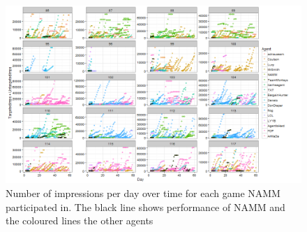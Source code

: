 \documentclass{sig-alternate-05-2015}
\begin{document}
\begin{figure}
\centering
\includegraphics[width = .9\linewidth]{appendix4.png}
\caption{Number of impressions per day over time for each game NAMM participated in. The black line shows performance of NAMM and the coloured lines the other agents}
\label{Appendix4}
\end{figure}
\end{document}
